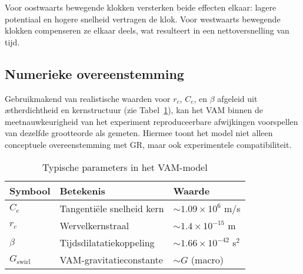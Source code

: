 Voor oostwaarts bewegende klokken versterken beide effecten elkaar: lagere potentiaal en hogere snelheid vertragen de klok. Voor westwaarts bewegende klokken compenseren ze elkaar deels, wat resulteert in een nettoversnelling van tijd.

\subsection{Numerieke overeenstemming}

Gebruikmakend van realistische waarden voor $r_c$, $C_e$, en $\beta$ afgeleid uit ætherdichtheid en kernstructuur (zie Tabel~\ref{tab:constants}), kan het VAM binnen de meetnauwkeurigheid van het experiment reproduceerbare afwijkingen voorspellen van dezelfde grootteorde als gemeten. Hiermee toont het model niet alleen conceptuele overeenstemming met GR, maar ook experimentele compatibiliteit.

\begin{table}[h!]
\centering
\caption{Typische parameters in het VAM-model}
\label{tab:constants}
\begin{tabular}{lll}
\toprule
Symbool & Betekenis & Waarde \\
\midrule
$C_e$ & Tangentiële snelheid kern & $\sim 1.09 \times 10^6$ m/s \\
$r_c$ & Wervelkernstraal & $\sim 1.4 \times 10^{-15}$ m \\
$\beta$ & Tijdsdilatatiekoppeling & $\sim 1.66 \times 10^{-42}$ s$^2$ \\
$G_{\text{swirl}}$ & VAM-gravitatieconstante & $\sim G$ (macro) \\
\bottomrule
\end{tabular}
\end{table}
